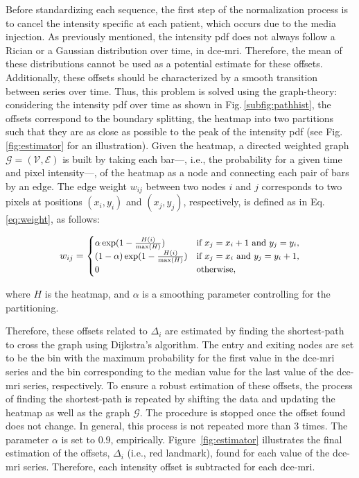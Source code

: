 Before standardizing each sequence, the first step of the
normalization process is to cancel the intensity specific at each
patient, which occurs due to the media injection.
As previously mentioned, the intensity \ac{pdf} does not always follow a Rician or a Gaussian distribution over time, in \ac{dce}-\ac{mri}.
Therefore, the mean of these distributions cannot be used as a potential estimate for these offsets.
Additionally, these offsets should be characterized by a smooth transition between series over time.
Thus, this problem is solved using the graph-theory: considering the intensity \ac{pdf} over time as shown in Fig.\,\ref{subfig:pathhist}, the offsets correspond to the boundary splitting, the heatmap into two partitions such that they are as close as possible to the peak of the intensity \ac{pdf} (see Fig.\,\ref{fig:estimator} for an illustration).
Given the heatmap, a directed weighted graph
$\mathcal{G}=(\mathcal{V}, \mathcal{E})$ is built by taking each
bar---, i.e., the probability for a given time and pixel intensity---,
of the heatmap as a node and connecting each pair of bars by an edge.
The edge weight $w_{ij}$ between two nodes $i$ and $j$ corresponds to
two pixels at positions $(x_i, y_i)$ and $(x_j, y_j)$, respectively,
is defined as in Eq.\,\eqref{eq:weight}, as follows:

\begin{equation}\small
  w_{ij} = \begin{cases}
    \alpha \exp(1 - \frac{H(i)}{\max(H)})       & \text{if } x_j = x_i + 1 \text{ and } y_j = y_i, \\
    (1 - \alpha) \exp(1 - \frac{H(i)}{\max(H)}) & \text{if } x_j = x_i \text{ and } y_j = y_i + 1, \\
    0                                           & \text{otherwise},
  \end{cases}
  \label{eq:weight}
\end{equation}

\noindent where $H$ is the heatmap, and $\alpha$ is a smoothing
parameter controlling for the partitioning.

Therefore, these offsets related to $\Delta_i$ are estimated by finding the shortest-path to cross the graph using Dijkstra's algorithm.
The entry and exiting nodes are set to be the bin with the maximum
probability for the first value in the \ac{dce}-\ac{mri} series and
the bin corresponding to the median value for the last value of the \ac{dce}-\ac{mri} series, respectively.
To ensure a robust estimation of these offsets, the process of finding the shortest-path is repeated by shifting the data and updating the heatmap as well as the graph $\mathcal{G}$.
The procedure is stopped once the offset found does not change.
In general, this process is not repeated more than 3 times.
The parameter $\alpha$ is set to $0.9$, empirically.
Figure~\ref{fig:estimator} illustrates the final estimation of the
offsets, $\Delta_i$ (i.e., red landmark), found for each value of the \ac{dce}-\ac{mri} series.
Therefore, each intensity offset is subtracted for each \ac{dce}-\ac{mri}.

